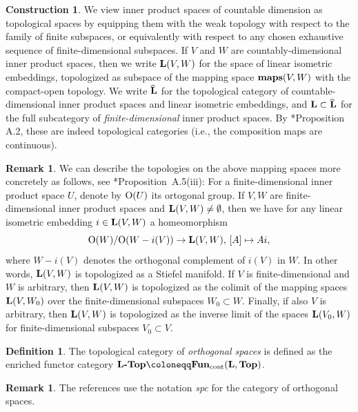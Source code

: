 \documentclass[reqno]{memo-l}
\theoremstyle{mythm}
\theoremstyle{definition}
\newtheorem{rk}[thm]{Remark}
\newtheorem{constr}[thm]{Construction}
\newtheorem{definition}[thm]{Definition}
\numberwithin{equation}{section}
\newcommand{\Lhat}{{\widehat{{\smash{\cat{L}}\vphantom{t}}\kern-1.75pt}\kern1.75pt}}
\newcommand{\cat}[1]{\textbf{\textup{#1}}}
\newcommand{\maps}{\cat{maps}}
\renewcommand{\O}{{\textup{O}}}
\newcommand{\cont}{\textup{cont}}
\begin{document}
\begin{constr}
    We view inner product spaces of countable dimension as topological spaces by equipping them with the weak topology with respect to the family of finite subspaces, or equivalently with respect to any chosen exhaustive sequence of finite-dimensional subspaces. If $V$ and $W$ are countably-dimensional inner product spaces, then we write $\cat{L}(V,W)$ for the space of linear isometric embeddings, topologized as subspace of the mapping space $\maps(V,W)$ with the compact-open topology. We write $\Lhat$ for the topological category of countable-dimensional inner product spaces and linear isometric embeddings, and $\cat{L}\subset\Lhat$ for the full subcategory of \emph{finite-dimensional} inner product spaces. By \cite{schwede_orbispaces_2020}*{Proposition A.2}, these are indeed topological categories (i.e., the composition maps are continuous).
\end{constr}

\begin{rk}\label{rk:L-top-explicit}
    We can describe the topologies on the above mapping spaces more concretely as follows, see \cite{schwede_orbispaces_2020}*{Proposition~A.5(iii)}:
    For a finite-dimensional inner product space $U$, denote by $\O(U)$ its ortogonal group. 
    If $V,W$ are finite-dimensional inner product spaces and $\cat{L}(V,W)\not=\emptyset$, then we have for any linear isometric embedding $i\in\cat{L}(V,W)$ a homeomorphism \[\O(W)/\O(W-i(V))\to\cat{L}(V,W),\, [A]\mapsto Ai,\] where $W-i(V)$ denotes the orthogonal complement of $i(V)$ in $W$. In other words, $\cat{L}(V,W)$ is topologized as a Stiefel manifold. If $V$ is finite-dimensional and $W$ is arbitrary, then $\cat{L}(V,W)$ is topologized as the colimit of the mapping spaces $\cat{L}(V,W_0)$ over the finite-dimensional subspaces $W_0\subset W$. Finally, if also $V$ is arbitrary, then $\cat{L}(V,W)$ is topologized as the inverse limit of the spaces $\cat{L}(V_0,W)$ for finite-dimensional subspaces $V_0\subset V$.
\end{rk}
    
\begin{definition}
    The topological category of \emph{orthogonal spaces} is defined as the enriched functor category $\cat{$\cat L$-Top}\coloneqq\cat{Fun}_\cont(\cat{L},\cat{Top})$.
\end{definition}

\begin{rk}
    The references \cites{schwede2018global,barrero2021} use the notation \textit{spc} for the category of orthogonal spaces.
\end{rk}
\end{document}
